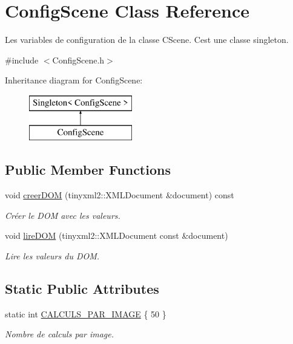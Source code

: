\hypertarget{class_config_scene}{}\section{Config\+Scene Class Reference}
\label{class_config_scene}


Les variables de configuration de la classe C\+Scene. C\textquotesingle{}est une classe singleton.  




{\ttfamily \#include $<$Config\+Scene.\+h$>$}

Inheritance diagram for Config\+Scene\+:\begin{figure}[H]
\begin{center}
\leavevmode
\includegraphics[height=2.000000cm]{class_config_scene}
\end{center}
\end{figure}
\subsection*{Public Member Functions}
\begin{DoxyCompactItemize}
\item 
void \hyperlink{group__inf2990_ga3d0152df0c8c134ecd1a1741302db839}{creer\+D\+O\+M} (tinyxml2\+::\+X\+M\+L\+Document \&document) const 
\begin{DoxyCompactList}\small\item\em Créer le D\+O\+M avec les valeurs. \end{DoxyCompactList}\item 
void \hyperlink{group__inf2990_gaeacd60be947ce76a1302f6bbb40c90b1}{lire\+D\+O\+M} (tinyxml2\+::\+X\+M\+L\+Document const \&document)
\begin{DoxyCompactList}\small\item\em Lire les valeurs du D\+O\+M. \end{DoxyCompactList}\end{DoxyCompactItemize}
\subsection*{Static Public Attributes}
\begin{DoxyCompactItemize}
\item 
\hypertarget{group__inf2990_gadb487b450a0314a5d1f75cf31ce502eb}{}static int \hyperlink{group__inf2990_gadb487b450a0314a5d1f75cf31ce502eb}{C\+A\+L\+C\+U\+L\+S\+\_\+\+P\+A\+R\+\_\+\+I\+M\+A\+G\+E} \{ 50 \}\label{group__inf2990_gadb487b450a0314a5d1f75cf31ce502eb}

\begin{DoxyCompactList}\small\item\em Nombre de calculs par image. \end{DoxyCompactList}\end{DoxyCompactItemize}
